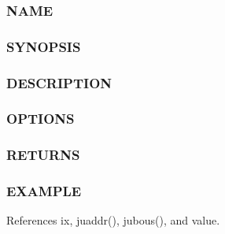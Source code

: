 \subsubsection*{N\+A\+ME}

\subsubsection*{S\+Y\+N\+O\+P\+S\+IS}

\subsubsection*{D\+E\+S\+C\+R\+I\+P\+T\+I\+ON}

\subsubsection*{O\+P\+T\+I\+O\+NS}

\subsubsection*{R\+E\+T\+U\+R\+NS}

\subsubsection*{E\+X\+A\+M\+P\+LE}

References ix, juaddr(), jubous(), and value.

